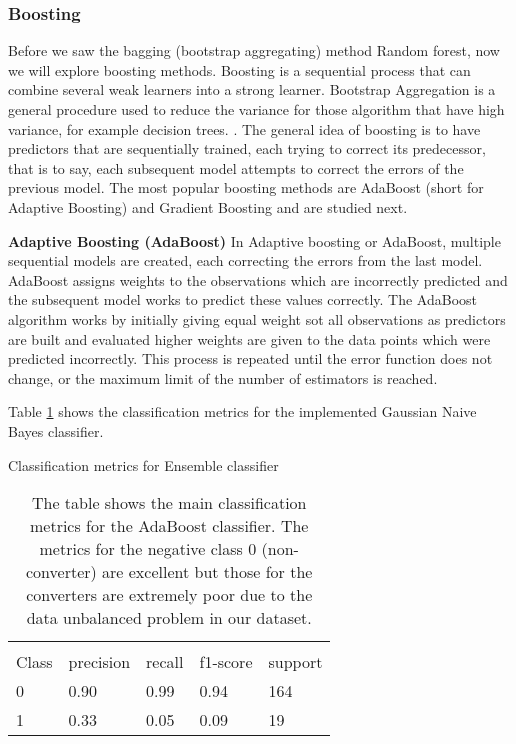 \documentclass[11pt]{article}
\begin{document}
\subsubsection{Boosting}
\label{se:resgradboosting}

Before we saw the bagging (bootstrap aggregating) method Random forest, now we will explore boosting methods.
Boosting is a sequential process that can combine several weak learners into a strong learner. Bootstrap Aggregation is a general procedure used to reduce the variance for those algorithm that have high variance, for example  decision trees. . The general idea of boosting is to have predictors that are sequentially trained, each trying to correct its predecessor, that is to say, each subsequent model attempts to correct the errors of the previous model.
The most popular boosting methods are AdaBoost (short for Adaptive Boosting) and Gradient Boosting and are studied next.

\textbf{Adaptive Boosting (AdaBoost)}
In Adaptive boosting or AdaBoost, multiple sequential models are created, each correcting the errors from the last model. AdaBoost assigns weights to the observations which are incorrectly predicted and the subsequent model works to predict these values correctly. The AdaBoost algorithm works by initially giving equal weight sot all observations as predictors are built and evaluated 
higher weights are given to the data points which were predicted incorrectly. This process is repeated until the error function does not change, or the maximum limit of the number of estimators is reached.

Table \ref{tab:ada} shows the classification metrics for the implemented Gaussian Naive Bayes classifier.
\begin{table}[H]
\caption{Classification metrics for Ensemble classifier} \label{tab:ada} 
\begin{center} 
\begin{tabular}{lllll}
\hline
\multicolumn{1}{c}{} \\
Class & precision & recall & f1-score & support     \\
\hline
0 & 0.90  &    0.99   &   0.94   &    164 \\
1 & 0.33  &    0.05   &   0.09   &    19 \\
\hline
\end{tabular}
\caption{The table shows the main classification metrics for the AdaBoost classifier. The metrics for the negative class 0 (non-converter) are excellent but those for the converters are extremely poor due to the data unbalanced problem in our dataset.
}
\end{center}
\end{table}
\end{document}
